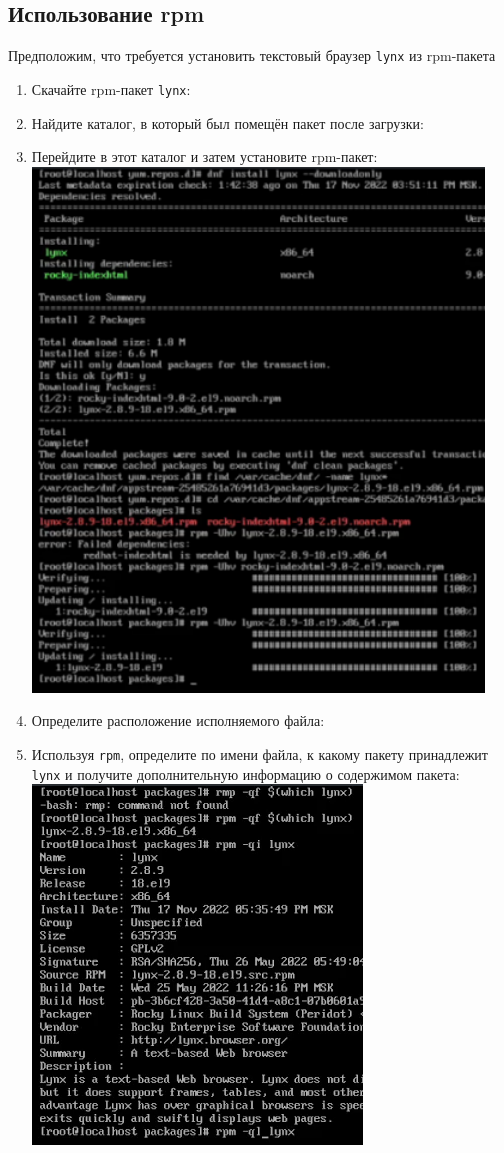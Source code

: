 \documentclass[12pt]{article}
\begin{document}
\subsection{Использование rpm}
Предположим, что требуется установить текстовый браузер \texttt{lynx} из rpm-пакета
\begin{enumerate}
	\item Скачайте rpm-пакет \texttt{lynx}:
	\item Найдите каталог, в который был помещён пакет после загрузки:
	\item Перейдите в этот каталог и затем установите rpm-пакет:
	      \\\includegraphics{7.png}
	\item Определите расположение исполняемого файла:
	\item Используя \texttt{rpm}, определите по имени файла, к какому пакету принадлежит \texttt{lynx} и получите дополнительную информацию о содержимом пакета:
	      \\\includegraphics{8.png}

\end{enumerate}
\end{document}
